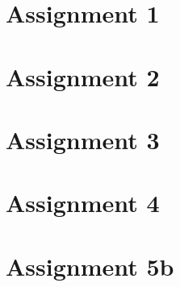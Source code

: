 \documentclass[../main.tex]{subfiles}
\begin{document}
\section{Assignment 1}%
\label{sec:assignment_1}

\newpage
\section{Assignment 2}%
\label{sec:assignment_2}

\newpage
\section{Assignment 3}%
\label{sec:assignment_3}

\newpage
\section{Assignment 4}%
\label{sec:assignment_4}

\newpage
\section{Assignment 5b}%
\label{sec:assignment_5b}


	
\end{document}
